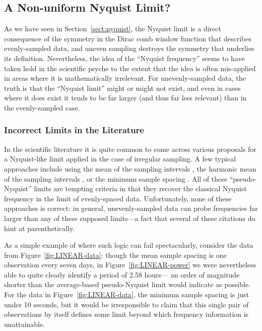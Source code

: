 \documentclass[preprint]{aastex}
\newcommand{\fig}[1]{Figure~\ref{fig:#1}}
\newcommand{\Sect}[1]{Section~\ref{sect:#1}}
\newcommand{\sect}[1]{\Sect{#1}}
\newcommand{\sectlabel}[1]{\label{sect:#1}}
\begin{document}
\subsection{A Non-uniform Nyquist Limit?}
\sectlabel{pseudo-nyquist}

As we have seen in \sect{nyquist}, the Nyquist limit is a direct consequence
of the symmetry in the Dirac comb window function that describes evenly-sampled data,
and uneven sampling destroys the symmetry that underlies its definition.
Nevertheless, the idea of the ``Nyquist frequency'' seems to have taken hold
in the scientific psyche to the extent that the idea is often mis-applied in
areas where it is mathematically irrelevant.
For unevenly-sampled data, the truth is that the ``Nyquist limit'' might or
might not exist, and even in cases where it does exist it tends to be far
larger (and thus far less relevant) than in the evenly-sampled case.

\subsubsection{Incorrect Limits in the Literature}

In the scientific literature it is quite common to come across various proposals
for a Nyquist-like limit applied in the case of irregular sampling.
A few typical approaches include using the mean of the sampling intervals
\citep[e.g.][]{Scargle82, Horne86, NumRec},
the harmonic mean of the sampling intervals \citep[e.g.][]{Debosscher07},
or the minimum sample spacing \citep[e.g.][]{Percy86, Roberts87, Press89, Hilditch01}.
All of these ``pseudo-Nyquist'' limits are tempting criteria in that
they recover the classical Nyquist 
frequency in the limit of evenly-spaced data.
Unfortunately, none of these approaches is correct: in general,
unevenly-sampled data can probe frequencies far larger than any of these
supposed limits---a fact that several of these citations do hint at
parenthetically.

As a simple example of where such logic can fail spectacularly,
consider the data from \fig{LINEAR-data}: though the mean sample
spacing is one observation every seven days, in \fig{LINEAR-power}
we were nevertheless able to quite clearly identify a period of 2.58 hours---
an order of magnitude shorter than the average-based pseudo-Nyquist limit
would indicate as possible.
For the data in \fig{LINEAR-data}, the minimum sample spacing is just under 10
seconds, but it would be irresponsible to claim that this single pair of
observations by itself defines some limit beyond which frequency information
is unattainable.
\end{document}
